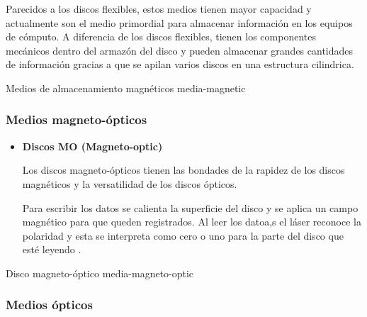 \begin{itemize}
Parecidos a los discos flexibles, estos medios tienen mayor capacidad y actualmente son el medio primordial para almacenar informaci\'{o}n en los equipos de c\'{o}mputo. A diferencia de los discos flexibles, tienen los componentes mec\'{a}nicos dentro del armaz\'{o}n del disco y pueden almacenar grandes cantidades de informaci\'{o}n gracias a que se apilan varios discos en una estructura cilindrica.
\end{itemize}

\diagramblock
{Medios de almacenamiento magn\'{e}ticos}
{media-magnetic}
{
 {
  
 }
}

      \subsubsection*{Medios magneto-\'{o}pticos}

\begin{itemize}

  \item \textbf{Discos MO (Magneto-optic)}

Los discos magneto-\'{o}pticos tienen las bondades de la rapidez de los discos magn\'{e}ticos y la versatilidad de los discos \'{o}pticos.

Para escribir los datos se calienta la superficie del disco y se aplica un campo magn\'{e}tico para que queden registrados. Al leer los datoa,s el l\'{a}ser reconoce la polaridad y esta se interpreta como cero o uno para la parte del disco que est\'{e} leyendo \cite{_illustrated_????}.

\end{itemize}

\diagramblock
{Disco magneto-\'{o}ptico}
{media-magneto-optic}
{
 {
  
 }
}

      \subsubsection*{Medios \'{o}pticos}

